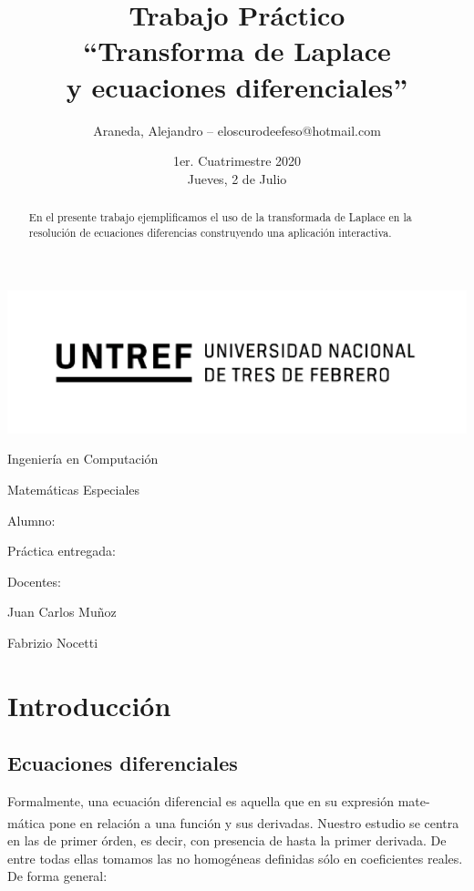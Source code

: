 \documentclass[a4paper]{article}
\title{Trabajo Práctico\\``Transforma de Laplace\\y ecuaciones diferenciales''}
\author{Araneda, Alejandro – eloscurodeefeso@hotmail.com}
\date{1er. Cuatrimestre 2020\\Jueves, 2 de Julio}
\def\teacher{Juan Carlos Muñoz
\and Fabrizio Nocetti}
\let\originalcite\cite
\renewcommand{\cite}[2][]{\textsuperscript{\originalcite{#2}}}
\begin{document}
\begin{titlepage}\renewcommand\and\par\centering\makeatletter
    \includegraphics{logo.png}\par
    {\Large Ingeniería en Computación \par}\vspace{0.5cm}
    {\LARGE Matemáticas Especiales \par}\vfill
    {\huge \@title \par}\vfill
    Alumno:\par
    \@author\vfill
    Práctica entregada:\par
    \@date\vfill
    Docentes:\par
    \teacher\vspace{1cm}\makeatother
\end{titlepage}

\begin{abstract}

    En el presente trabajo ejemplificamos el uso de la transformada
    de Laplace en la resolución de ecuaciones diferencias 
    construyendo una aplicación interactiva.

\end{abstract}

\section{Introducción}

\subsection*{Ecuaciones diferenciales}

Formalmente, una ecuación diferencial es aquella que en su 
expresión mate-mática pone en relación a una función y sus 
derivadas\cite{bib:zill}. Nuestro estudio se centra en las de primer órden, es 
decir, con presencia de hasta la primer derivada. 
De entre todas ellas tomamos las no homogéneas definidas 
sólo en coeficientes reales. De forma general:
\end{document}
